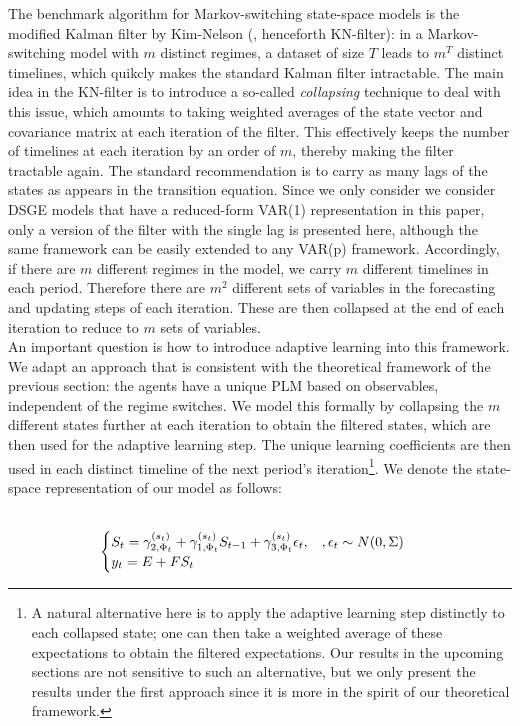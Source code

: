 \documentclass[12pt,reqno]{article}
\numberwithin{equation}{section}
\begin{document}
The benchmark algorithm for Markov-switching state-space models is the modified Kalman filter by Kim-Nelson (\cite{kim1999state}, henceforth KN-filter): in a Markov-switching model with $m $ distinct regimes, a dataset of size $T$ leads to $m^T$ distinct timelines, which quikcly makes the standard Kalman filter intractable. The main idea in the KN-filter is to introduce a so-called \textit{collapsing} technique to deal with this issue, which amounts to taking weighted averages of the state vector and covariance matrix at each iteration of the filter. This effectively keeps the number of timelines at each iteration by an order of $m$, thereby making the filter tractable again. The standard recommendation is to carry as many lags of the states as appears in the transition equation. Since we only consider we consider DSGE models that have a reduced-form VAR(1) representation in this paper, only a version of the filter with the single lag is presented here, although the same framework can be easily extended to any VAR(p) framework. Accordingly,  if there are $ m $ different regimes in the model, we carry $m $ different timelines in each period. Therefore there are $m^2$ different sets of variables in the forecasting and updating steps of each iteration. These are then collapsed at the end of each iteration to reduce to $m $ sets of variables. \\
\noindent
An important question is how to introduce adaptive learning into this framework. We adapt an approach that is consistent with the theoretical framework of the previous section: the agents have a unique PLM based on observables, independent of the regime switches. We model this formally by collapsing the $m $ different states further at each iteration to obtain the {filtered states}, which are then used for the adaptive learning step. The unique learning coefficients are then used in each distinct timeline of the next period’s iteration\footnote{A natural alternative here is to apply the adaptive learning step distinctly to each collapsed state; one can then take a weighted average of these expectations to obtain the {filtered expectations}. Our results in the upcoming sections are not sensitive to such an alternative, but we only present the results under the first approach since it is more in the spirit of our theoretical framework.}. We denote the state-space representation of our model as follows: \\\

$$
\begin{cases}
S_t = \gamma_{2,\Phi_t}^{(s_t)} + \gamma_{1,\Phi_t}^{(s_t)} S_{t-1} + \gamma_{3,\Phi_t}^{(s_t)} \epsilon_t, \hspace{3 mm}, \epsilon_t \sim N(0, \Sigma) \\
y_t = E+ F S_t \\
\end{cases}
$$
\end{document}
